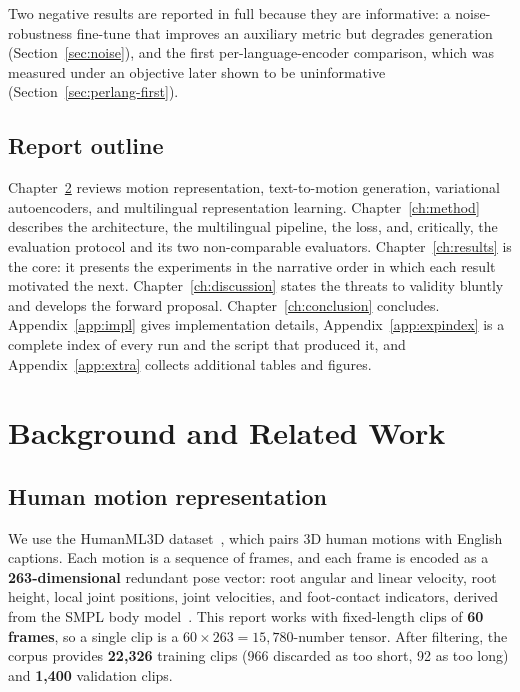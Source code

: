 \documentclass[11pt,a4paper]{report}
\begin{document}
Two negative results are reported in full because they are informative: a
noise-robustness fine-tune that improves an auxiliary metric but degrades
generation (Section~\ref{sec:noise}), and the first per-language-encoder
comparison, which was measured under an objective later shown to be
uninformative (Section~\ref{sec:perlang-first}).

\section{Report outline}

Chapter~\ref{ch:background} reviews motion representation, text-to-motion
generation, variational autoencoders, and multilingual representation
learning. Chapter~\ref{ch:method} describes the architecture, the
multilingual pipeline, the loss, and, critically, the evaluation
protocol and its two non-comparable evaluators. Chapter~\ref{ch:results}
is the core: it presents the experiments in the narrative order in which
each result motivated the next. Chapter~\ref{ch:discussion} states the
threats to validity bluntly and develops the forward proposal.
Chapter~\ref{ch:conclusion} concludes. Appendix~\ref{app:impl} gives
implementation details, Appendix~\ref{app:expindex} is a complete index of
every run and the script that produced it, and Appendix~\ref{app:extra}
collects additional tables and figures.

\chapter{Background and Related Work}
\label{ch:background}

\section{Human motion representation}

We use the HumanML3D dataset~\cite{guo2022humanml3d}, which pairs 3D human
motions with English captions. Each motion is a sequence of frames, and
each frame is encoded as a \textbf{263-dimensional} redundant pose vector:
root angular and linear velocity, root height, local joint positions,
joint velocities, and foot-contact indicators, derived from the SMPL body
model~\cite{loper2015smpl}. This report works with fixed-length clips of
\textbf{60 frames}, so a single clip is a $60\times263 = 15{,}780$-number
tensor. After filtering, the corpus provides \textbf{22{,}326} training
clips (966 discarded as too short, 92 as too long) and \textbf{1{,}400}
validation clips.
\end{document}
